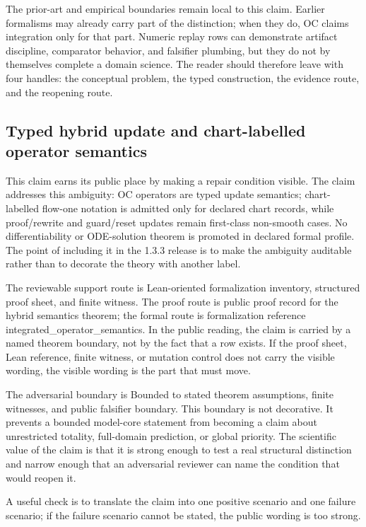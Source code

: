 The prior-art and empirical boundaries remain local to this claim. Earlier formalisms may already carry part of the distinction; when they do, OC claims integration only for that part. Numeric replay rows can demonstrate artifact discipline, comparator behavior, and falsifier plumbing, but they do not by themselves complete a domain science. The reader should therefore leave with four handles: the conceptual problem, the typed construction, the evidence route, and the reopening route.

\subsection{Typed hybrid update and chart-labelled operator semantics}
This claim earns its public place by making a repair condition visible. The claim addresses this ambiguity: OC operators are typed update semantics; chart-labelled flow-one notation is admitted only for declared chart records, while proof/rewrite and guard/reset updates remain first-class non-smooth cases. No differentiability or ODE-solution theorem is promoted in declared formal profile. The point of including it in the 1.3.3 release is to make the ambiguity auditable rather than to decorate the theory with another label.

The reviewable support route is Lean-oriented formalization inventory, structured proof sheet, and finite witness. The proof route is public proof record for the hybrid semantics theorem; the formal route is formalization reference integrated\_operator\_semantics. In the public reading, the claim is carried by a named theorem boundary, not by the fact that a row exists. If the proof sheet, Lean reference, finite witness, or mutation control does not carry the visible wording, the visible wording is the part that must move.

The adversarial boundary is Bounded to stated theorem assumptions, finite witnesses, and public falsifier boundary. This boundary is not decorative. It prevents a bounded model-core statement from becoming a claim about unrestricted totality, full-domain prediction, or global priority. The scientific value of the claim is that it is strong enough to test a real structural distinction and narrow enough that an adversarial reviewer can name the condition that would reopen it.

A useful check is to translate the claim into one positive scenario and one failure scenario; if the failure scenario cannot be stated, the public wording is too strong.

